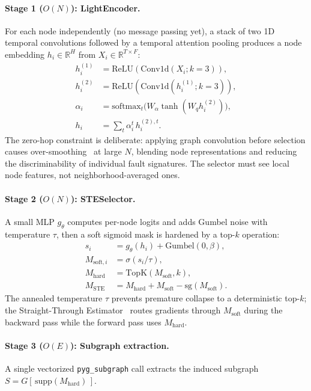 \documentclass[11pt,a4paper]{article}
\begin{document}
\paragraph{Stage 1 ($O(N)$): LightEncoder.}
For each node independently (no message passing yet), a stack of two 1D
temporal convolutions followed by a temporal attention pooling produces a
node embedding $h_i \in \mathbb{R}^H$ from $X_i \in \mathbb{R}^{T \times F}$:
\begin{align}
  h_i^{(1)} &= \mathrm{ReLU}(\mathrm{Conv1d}(X_i; k{=}3)), \\
  h_i^{(2)} &= \mathrm{ReLU}(\mathrm{Conv1d}(h_i^{(1)}; k{=}3)), \\
  \alpha_i  &= \mathrm{softmax}_t\big(W_\alpha \tanh(W_q h_i^{(2)})\big), \\
  h_i       &= \textstyle\sum_t \alpha_i^t \, h_i^{(2),t}.
\end{align}
The zero-hop constraint is deliberate: applying graph convolution before
selection causes over-smoothing~\cite{li2018smoothing} at large $N$, blending
node representations and reducing the discriminability of individual fault
signatures. The selector must see local node features, not
neighborhood-averaged ones.

\paragraph{Stage 2 ($O(N)$): STESelector.}
A small MLP $g_\theta$ computes per-node logits and adds Gumbel noise with
temperature $\tau$, then a soft sigmoid mask is hardened by a top-$k$
operation:
\begin{align}
  s_i &= g_\theta(h_i) + \mathrm{Gumbel}(0, \beta), \\
  M_{\mathrm{soft},i} &= \sigma(s_i / \tau), \\
  M_{\mathrm{hard}}   &= \mathrm{TopK}(M_{\mathrm{soft}}, k), \\
  M_{\mathrm{STE}}    &= M_{\mathrm{hard}} + M_{\mathrm{soft}} - \mathrm{sg}(M_{\mathrm{soft}}). \label{eq:ste}
\end{align}
The annealed temperature $\tau$ prevents premature collapse to a
deterministic top-$k$; the Straight-Through
Estimator~\cite{bengio2013ste,jang2017gumbel} routes gradients through
$M_{\mathrm{soft}}$ during the backward pass while the forward pass uses
$M_{\mathrm{hard}}$.

\paragraph{Stage 3 ($O(E)$): Subgraph extraction.}
A single vectorized \texttt{pyg\_subgraph} call extracts the induced
subgraph $S = G[\,\mathrm{supp}(M_{\mathrm{hard}})\,]$.
\end{document}
